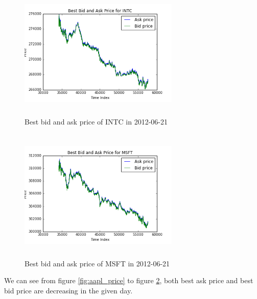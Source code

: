 \begin{figure}[hbtp]
  \begin{center}
    \includegraphics[width=3in,height=2.5in]{figures/INTC_price.png}
  \end{center}
\caption{Best bid and ask price of INTC in 2012-06-21} \label{fig:intc_price}
\end{figure}

\begin{figure}[hbtp]
  \begin{center}
    \includegraphics[width=3in,height=2.5in]{figures/MSFT_price.png}
  \end{center}
\caption{Best bid and ask price of MSFT in 2012-06-21} \label{fig:msft_price}
\end{figure}

We can see from figure \ref{fig:aapl_price} to figure \ref{fig:msft_price}, both best ask price and best bid price are decreasing in the given day. \\


